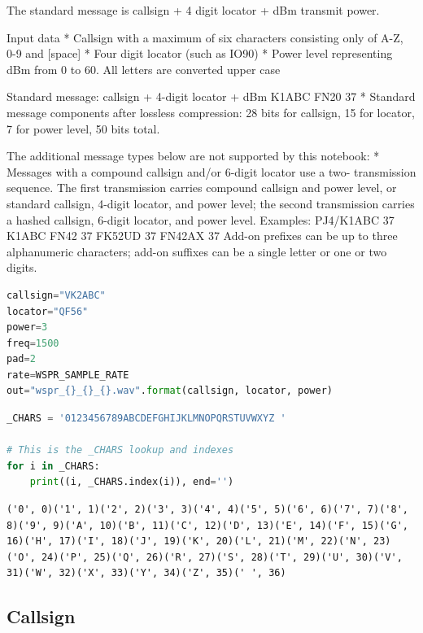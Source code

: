The standard message is callsign + 4 digit locator + dBm transmit power.

Input data * Callsign with a maximum of six characters consisting only
of A-Z, 0-9 and {[}space{]} * Four digit locator (such as IO90) * Power
level representing dBm from 0 to 60. All letters are converted upper
case

Standard message: callsign + 4-digit locator + dBm K1ABC FN20 37 *
Standard message components after lossless compression: 28 bits for
callsign, 15 for locator, 7 for power level, 50 bits total.

The additional message types below are not supported by this notebook: *
Messages with a compound callsign and/or 6-digit locator use a two-
transmission sequence. The first transmission carries compound callsign
and power level, or standard callsign, 4-digit locator, and power level;
the second transmission carries a hashed callsign, 6-digit locator, and
power level. Examples: PJ4/K1ABC 37 K1ABC FN42 37 FK52UD 37 FN42AX 37
Add-on prefixes can be up to three alphanumeric characters; add-on
suffixes can be a single letter or one or two digits.

\begin{lstlisting}[language=Python]
callsign="VK2ABC"
locator="QF56"
power=3
freq=1500
pad=2
rate=WSPR_SAMPLE_RATE
out="wspr_{}_{}_{}.wav".format(callsign, locator, power)
\end{lstlisting}

\begin{lstlisting}[language=Python]
_CHARS = '0123456789ABCDEFGHIJKLMNOPQRSTUVWXYZ '

# This is the _CHARS lookup and indexes
for i in _CHARS:
    print((i, _CHARS.index(i)), end='')
\end{lstlisting}

\begin{lstlisting}
('0', 0)('1', 1)('2', 2)('3', 3)('4', 4)('5', 5)('6', 6)('7', 7)('8', 8)('9', 9)('A', 10)('B', 11)('C', 12)('D', 13)('E', 14)('F', 15)('G', 16)('H', 17)('I', 18)('J', 19)('K', 20)('L', 21)('M', 22)('N', 23)('O', 24)('P', 25)('Q', 26)('R', 27)('S', 28)('T', 29)('U', 30)('V', 31)('W', 32)('X', 33)('Y', 34)('Z', 35)(' ', 36)
\end{lstlisting}

\hypertarget{callsign}{%
\subsection{Callsign}\label{callsign}}

